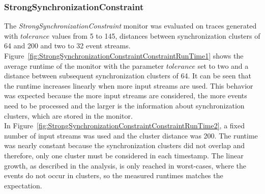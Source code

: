 \subsubsection{StrongSynchronizationConstraint}
	The \textit{StrongSynchronizationConstraint} monitor was evaluated on traces generated with $tolerance$ values from 5 to 145, distances between synchronization clusters of 64 and 200 and two to 32 event streams.\\
	Figure~\ref{fig:StrongSynchronizationConstraintConstraintRunTime1} shows the average runtime of the monitor with the parameter $tolerance$ set to two and a distance between subsequent synchronization clusters of 64. It can be seen that the runtime increases linearly when more input streams are used. This behavior was expected because the more input streams are considered, the more events need to be processed and the larger is the information about synchronization clusters, which are stored in the monitor.\\
	In Figure~\ref{fig:StrongSynchronizationConstraintConstraintRunTime2}, a fixed number of input streams was used and the cluster distance was 200. The runtime was nearly constant because the synchronization clusters did not overlap and therefore, only one cluster must be considered in each timestamp. The linear growth, as described in the analysis, is only reached in worst-cases, where the events do not occur in clusters, so the measured runtimes matches the expectation.
